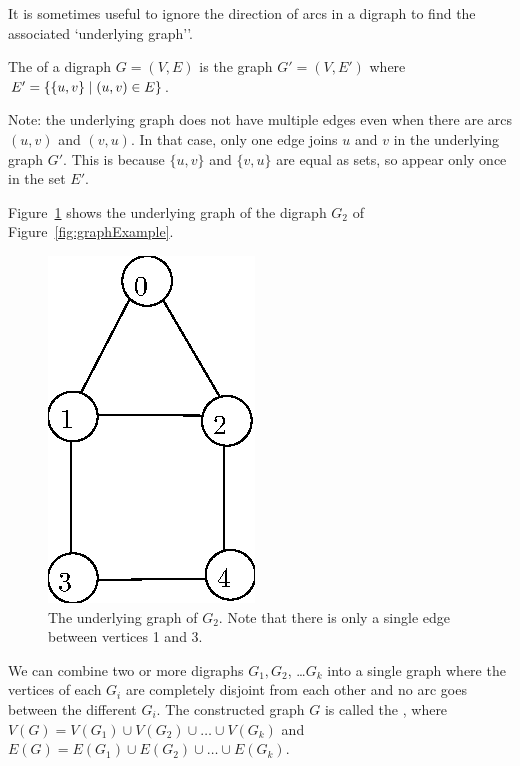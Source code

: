It is sometimes useful to ignore the direction of arcs in a digraph to find the associated `underlying graph''.

\begin{Definition}
The  of a digraph $G = (V, E)$ is the graph 
$G' = (V, E')$ where $E' = \mbox{$\{\{u, v\} \mid (u, v)\in E\}$}$.
\end{Definition}


Note: the underlying graph does not have multiple
edges even when there are arcs $(u, v)$ and $(v, u)$. In that case,  only
one edge joins $u$ and $v$ in the underlying graph $G'$.  This is because $\{u, v\}$ and
$\{v, u\}$ are equal as sets, so appear only once in the set $E'$.

\begin{Example}
Figure~\ref{fig:underly} shows the underlying graph of the digraph 
$G_2$ of Figure~\ref{fig:graphExample}.
\end{Example}

\begin{figure}
\begin{center}
\includegraphics{figs/wUnderly.eps}
\end{center}
\caption{The underlying graph of $G_2$. Note that there is only a single edge between vertices 1 and 3.}
\label{fig:underly}
\end{figure}

\begin{Definition} 
We can combine two or more digraphs $G_1, G_2$, \ldots $G_k$ into a
single graph where the vertices of each $G_i$ are completely disjoint from
each other and no arc goes between the different $G_i$. The constructed
graph $G$ is called the , where $V(G) = V(G_1) \cup
V(G_2) \cup \ldots \cup V(G_k)$ and $E(G) = E(G_1) \cup E(G_2) \cup \ldots
\cup E(G_k)$.
\end{Definition}









